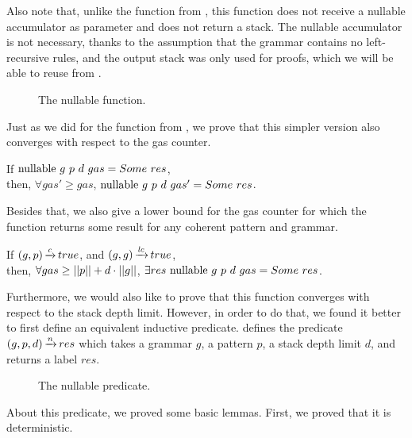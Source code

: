 Also note that, unlike the function from ,
this function does not receive a nullable accumulator as parameter
and does not return a stack.
The nullable accumulator is not necessary,
thanks to the assumption that
the grammar contains no left-recursive rules,
and the output stack was only used for proofs,
which we will be able to reuse from .

\begin{figure}
    \centering
    
    \caption{The nullable function.}
    \label{fig:nullable-function}
\end{figure}

Just as we did for the function from ,
we prove that this simpler version also converges
with respect to the gas counter.

\begin{lemma}%
    If $\text{nullable}\ g\ p\ d\ gas = Some\ res$, \\
    then, $\forall gas' \ge gas$,
    $\text{nullable}\ g\ p\ d\ gas' = Some\ res$.
    \label{lemma:nullable-gas-convergence}
\end{lemma}

Besides that, we also give a lower bound
for the gas counter for which the function
returns some result
for any coherent pattern and grammar.

\begin{lemma}%
    If $(g,p) \operatorname{\xrightarrow{\mathit{c}}} true$,
    and $(g,g) \operatorname{\xrightarrow{\mathit{lc}}} true$, \\
    then, $\forall gas \ge ||p|| + d \cdot ||g||$,
    $\exists res\ \nullablecomp{g}{p}{d}{gas} = \Some res$.
    \label{lemma:nullable-termination}
\end{lemma}

Furthermore, we would also like to prove that
this function converges with respect to the stack depth limit.
However, in order to do that,
we found it better to first define an equivalent inductive predicate.
 defines the predicate
$(g,p,d) \operatorname{\xrightarrow{\mathit{n}}} res$ which takes a grammar $g$,
a pattern $p$, a stack depth limit $d$, and returns a label $res$.

\begin{figure}
    \centering
    
    \caption{The nullable predicate.}
    \label{fig:nullable-predicate}
\end{figure}

About this predicate, we proved some basic lemmas.
First, we proved that it is deterministic.

